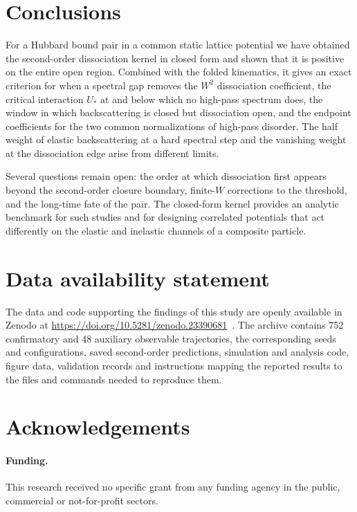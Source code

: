 \documentclass[12pt,a4paper]{article}
\theoremstyle{remark}
\newcommand{\Ustar}{U_{*}}
\begin{document}
\section{Conclusions}\label{sec:conclusions}

For a Hubbard bound pair in a common static lattice potential we have obtained the second-order dissociation kernel in closed form and shown that it is positive on the entire open region. Combined with the folded kinematics, it gives an exact criterion for when a spectral gap removes the $W^2$ dissociation coefficient, the critical interaction $\Ustar$ at and below which no high-pass spectrum does, the window in which backscattering is closed but dissociation open, and the endpoint coefficients for the two common normalizations of high-pass disorder. The half weight of elastic backscattering at a hard spectral step and the vanishing weight at the dissociation edge arise from different limits.

Several questions remain open: the order at which dissociation first appears beyond the second-order closure boundary, finite-$W$ corrections to the threshold, and the long-time fate of the pair. The closed-form kernel provides an analytic benchmark for such studies and for designing correlated potentials that act differently on the elastic and inelastic channels of a composite particle.

\section*{Data availability statement}
The data and code supporting the findings of this study are openly available in Zenodo at \url{https://doi.org/10.5281/zenodo.23390681}~\cite{JinZenodo2026}. The archive contains 752 confirmatory and 48 auxiliary observable trajectories, the corresponding seeds and configurations, saved second-order predictions, simulation and analysis code, figure data, validation records and instructions mapping the reported results to the files and commands needed to reproduce them.

\section*{Acknowledgements}

\paragraph{Funding.}
This research received no specific grant from any funding agency in the public, commercial or not-for-profit sectors.
\end{document}
